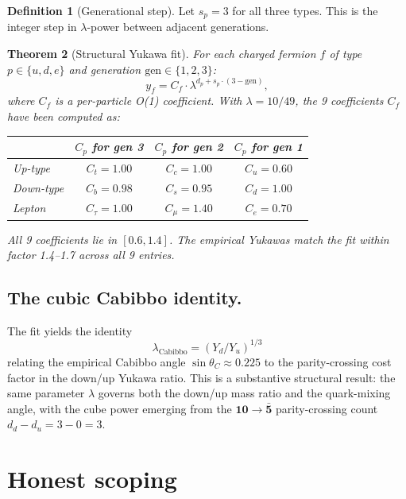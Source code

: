 \documentclass[11pt,reqno]{amsart}
\theoremstyle{plain}
\newtheorem{theorem}{Theorem}[section]
\theoremstyle{definition}
\newtheorem{definition}[theorem]{Definition}
\theoremstyle{remark}
\begin{document}
\begin{definition}[Generational step]
Let $s_p = 3$ for all three types. This is the integer step in
$\lambda$-power between adjacent generations.
\end{definition}

\begin{theorem}[Structural Yukawa fit]\label{thm:fit}
For each charged fermion $f$ of type $p \in \{u, d, e\}$ and generation
$\text{gen} \in \{1, 2, 3\}$:
\[
y_f = C_f \cdot \lambda^{d_p + s_p \cdot (3 - \text{gen})},
\]
where $C_f$ is a per-particle O(1) coefficient. With $\lambda = 10/49$,
the 9 coefficients $C_f$ have been computed as:
\begin{center}
\begin{tabular}{lccc}
\toprule
& $C_p$ for gen 3 & $C_p$ for gen 2 & $C_p$ for gen 1 \\
\midrule
Up-type    & $C_t = 1.00$ & $C_c = 1.00$ & $C_u = 0.60$ \\
Down-type  & $C_b = 0.98$ & $C_s = 0.95$ & $C_d = 1.00$ \\
Lepton     & $C_\tau = 1.00$ & $C_\mu = 1.40$ & $C_e = 0.70$ \\
\bottomrule
\end{tabular}
\end{center}
All 9 coefficients lie in $[0.6, 1.4]$. The empirical Yukawas match the
fit within factor 1.4--1.7 across all 9 entries.
\end{theorem}

\subsection{The cubic Cabibbo identity.}
The fit yields the identity
\[
\lambda_\text{Cabibbo} = (Y_d/Y_u)^{1/3}
\]
relating the empirical Cabibbo angle $\sin\theta_C \approx 0.225$ to the
parity-crossing cost factor in the down/up Yukawa ratio. This is a
substantive structural result: the same parameter $\lambda$ governs both
the down/up mass ratio and the quark-mixing angle, with the cube power
emerging from the $\mathbf{10} \to \bar{\mathbf{5}}$ parity-crossing
count $d_d - d_u = 3 - 0 = 3$.

\section{Honest scoping}
\end{document}
